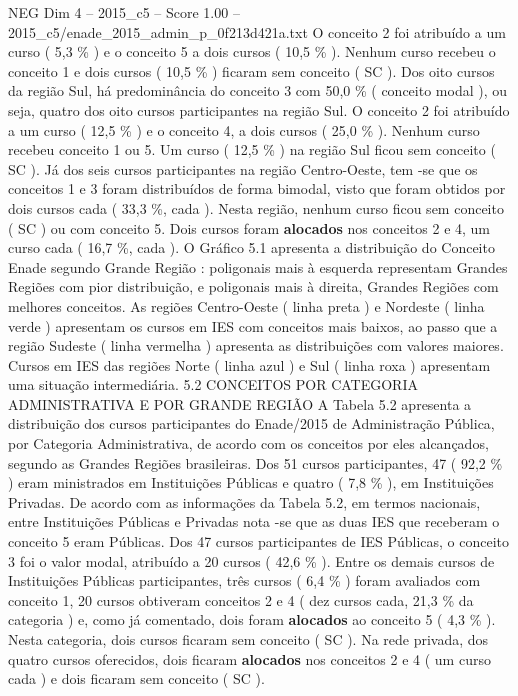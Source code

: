 \begin{textsample}{NEG Dim 4 – 2015\_c5 – Score 1.00 – 2015\_c5/enade\_2015\_admin\_p\_0f213d421a.txt}
O conceito 2 foi atribuído a um curso ( 5,3 \% ) e o conceito 5 a dois cursos ( 10,5 \% ).
Nenhum curso recebeu o conceito 1 e dois cursos ( 10,5 \% ) ficaram sem conceito ( SC ).
Dos oito cursos da região Sul, há predominância do conceito 3 com 50,0 \% ( conceito modal ), ou seja, quatro dos oito cursos participantes na região Sul.
O conceito 2 foi atribuído a um curso ( 12,5 \% ) e o conceito 4, a dois cursos ( 25,0 \% ).
Nenhum curso recebeu conceito 1 ou 5.
Um curso ( 12,5 \% ) na região Sul ficou sem conceito ( SC ).
Já dos seis cursos participantes na região Centro-Oeste, tem -se que os conceitos 1 e 3 foram distribuídos de forma bimodal, visto que foram obtidos por dois cursos cada ( 33,3 \%, cada ).
Nesta região, nenhum curso ficou sem conceito ( SC ) ou com conceito 5.
Dois cursos foram \textbf{alocados} nos conceitos 2 e 4, um curso cada ( 16,7 \%, cada ).
O Gráfico 5.1 apresenta a distribuição do Conceito Enade segundo Grande Região : poligonais mais à esquerda representam Grandes Regiões com pior distribuição, e poligonais mais à direita, Grandes Regiões com melhores conceitos.
As regiões Centro-Oeste ( linha preta ) e Nordeste ( linha verde ) apresentam os cursos em IES com conceitos mais baixos, ao passo que a região Sudeste ( linha vermelha ) apresenta as distribuições com valores maiores.
Cursos em IES das regiões Norte ( linha azul ) e Sul ( linha roxa ) apresentam uma situação intermediária. 5.2 CONCEITOS POR CATEGORIA ADMINISTRATIVA E POR GRANDE REGIÃO A Tabela 5.2 apresenta a distribuição dos cursos participantes do Enade/2015 de Administração Pública, por Categoria Administrativa, de acordo com os conceitos por eles alcançados, segundo as Grandes Regiões brasileiras.
Dos 51 cursos participantes, 47 ( 92,2 \% ) eram ministrados em Instituições Públicas e quatro ( 7,8 \% ), em Instituições Privadas.
De acordo com as informações da Tabela 5.2, em termos nacionais, entre Instituições Públicas e Privadas nota -se que as duas IES que receberam o conceito 5 eram Públicas.
Dos 47 cursos participantes de IES Públicas, o conceito 3 foi o valor modal, atribuído a 20 cursos ( 42,6 \% ).
Entre os demais cursos de Instituições Públicas participantes, três cursos ( 6,4 \% ) foram avaliados com conceito 1, 20 cursos obtiveram conceitos 2 e 4 ( dez cursos cada, 21,3 \% da categoria ) e, como já comentado, dois foram \textbf{alocados} ao conceito 5 ( 4,3 \% ).
Nesta categoria, dois cursos ficaram sem conceito ( SC ).
Na rede privada, dos quatro cursos oferecidos, dois ficaram \textbf{alocados} nos conceitos 2 e 4 ( um curso cada ) e dois ficaram sem conceito ( SC ).

\end{textsample}
